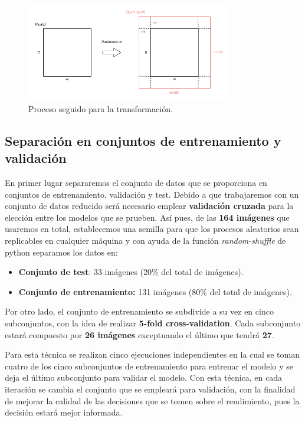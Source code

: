             \begin{figure}[!h]
                \centering
                \includegraphics[width=0.8\textwidth]{img/Transformacion_rectangulo.png}
                \caption{Proceso seguido para la transformación.}
                \label{fig:Transformacion_BB}
            \end{figure}



    \subsection{Separación en conjuntos de entrenamiento y validación}
        \noindent En primer lugar separaremos el conjunto de datos que se proporciona en conjuntos de entrenamiento, validación y test. Debido a que trabajaremos con un conjunto de datos reducido será necesario emplear \textbf{validación cruzada} para la elección entre los modelos que se prueben. Así pues, de las \textbf{164 imágenes} que usaremos en total, establecemos una semilla para que los procesos aleatorios sean replicables en cualquier máquina y con ayuda de la función \textit{random-shuffle} de python separamos los datos en: 

        \begin{itemize}
            \item \textbf{Conjunto de test}: 33 imágenes ($20\%$ del total de imágenes).
            \item \textbf{Conjunto de entrenamiento:} 131 imágenes ($80\%$ del total de imágenes).
        \end{itemize}

        \noindent Por otro lado, el conjunto de entrenamiento se subdivide a su vez en cinco subconjuntos, con la idea de realizar \textbf{5-fold cross-validation}. Cada subconjunto estará compuesto por \textbf{26 imágenes} exceptuando el último que tendrá \textbf{27}.
        
        \medskip

        \noindent Para esta técnica se realizan cinco ejecuciones independientes en la cual se toman cuatro de los cinco subconjuntos de entrenamiento para entrenar el modelo y se deja el último subconjunto para validar el modelo. Con esta técnica, en cada iteración se cambia el conjunto que se empleará para validación, con la finalidad de mejorar la calidad de las decisiones que se tomen sobre el rendimiento, pues la decisión estará mejor informada. 

